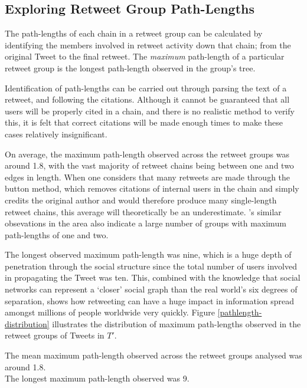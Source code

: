 \subsection{Exploring Retweet Group Path-Lengths}
The path-lengths of each chain in a retweet group can be calculated by identifying the members involved in retweet activity down that chain; from the original Tweet to the final retweet. The \textit{maximum} path-length of a particular retweet group is the longest path-length observed in the group's tree.

Identification of path-lengths can be carried out through parsing the text of a retweet, and following the citations. Although it cannot be guaranteed that all users will be properly cited in a chain, and there is no realistic method to verify this, it is felt that correct citations will be made enough times to make these cases relatively insignificant.

On average, the maximum path-length observed across the retweet groups was around 1.8, with the vast majority of retweet chains being between one and two edges in length. When one considers that many retweets are made through the button method, which removes citations of internal users in the chain and simply credits the original author and would therefore produce many single-length retweet chains, this average will theoretically be an underestimate. \cite{kwak10}'s similar obsevations in the area also indicate a large number of groups with maximum path-lengths of one and two.

The longest observed maximum path-length was nine, which is a huge depth of penetration through the social structure since the total number of users involved in propagating the Tweet was ten. This, combined with the knowledge that social networks can represent a `closer' social graph than the real world's six degrees of separation, shows how retweeting can have a huge impact in information spread amongst millions of people worldwide very quickly. Figure \ref{pathlength-distribution} illustrates the distribution of maximum path-lengths observed in the retweet groups of Tweets in $T'$.

\begin{myobservation}
\label{observation:path-length}
The mean maximum path-length observed across the retweet groups analysed was around 1.8.\\
The longest maximum path-length observed was 9.
\end{myobservation}

